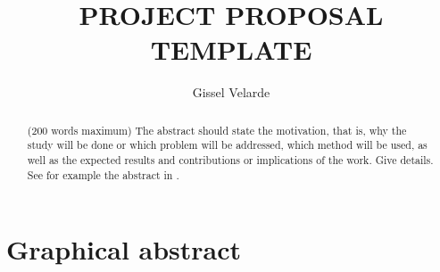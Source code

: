 \documentclass[11pt,a4paper]{article}
\title{PROJECT PROPOSAL TEMPLATE}
\author{ Gissel Velarde }
\begin{document}
\maketitle	

 \tableofcontents
 \pagebreak
\begin{abstract}
({\color{blue}200 words maximum}) The abstract should state the motivation, that is, why the study will be done or which problem will be addressed, which method will be used, as well as the expected results and contributions or implications of the work. Give details. See for example the abstract in \cite{krizhevsky2017imagenet}.
\end{abstract}


\section{Graphical abstract}
\end{document}
